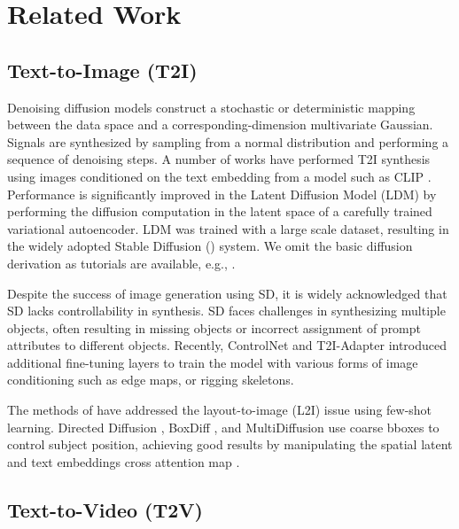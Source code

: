 \section{Related Work}
\label{sec:related}

\subsection{Text-to-Image (T2I)}

Denoising diffusion models construct a stochastic \cite{sohldickstein15,songScorematching19,hoDDPM20} or deterministic \cite{DDIM} mapping between the data space and a corresponding-dimension multivariate Gaussian. Signals are synthesized by sampling from a normal distribution and performing a sequence of denoising steps. A number of works \cite{GLIDE,nichol2021improved,DALLE2,Saharia2022PhotorealisticTD} have performed T2I synthesis using images conditioned on the text embedding from a model such as CLIP \cite{CLIP}. Performance is significantly improved in the Latent Diffusion Model \cite{RombachStablediffusion21} (LDM) by performing the diffusion computation in the latent space of a carefully trained variational autoencoder. LDM was trained with a large scale dataset, resulting in the widely adopted Stable Diffusion (\SD) system. We omit the basic diffusion derivation as tutorials are available, e.g., \cite{blogLillog}.

Despite the success of image generation using SD, it is widely acknowledged that SD lacks controllability in synthesis. SD faces challenges in synthesizing multiple objects, often resulting in missing objects or incorrect assignment of prompt attributes to different objects. Recently, ControlNet \cite{controlnet} and T2I-Adapter \cite{mou2023t2i} introduced additional fine-tuning layers to train the model with various forms of image conditioning such as edge maps, or rigging skeletons.

The methods of \cite{layout2im,L2Igan,L2Ixformer,ma2023directed,boxdiff,multidiffusion} have addressed the layout-to-image (L2I) issue using few-shot learning. Directed Diffusion \cite{ma2023directed}, BoxDiff \cite{boxdiff}, and MultiDiffusion \cite{multidiffusion} use coarse bboxes to control subject position, achieving good results by manipulating the spatial latent and text embeddings cross attention map \cite{PromptToPrompt}.

\subsection{Text-to-Video (T2V)}

